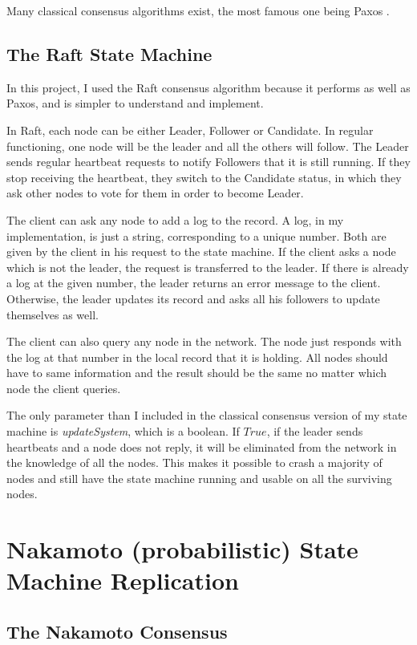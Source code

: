 \documentclass[11pt, twocolumn]{article}
\begin{document}
Many classical consensus algorithms exist, the most famous one being Paxos \cite{parliament}.
\subsection{The Raft State Machine}
In this project, I used the Raft consensus algorithm \cite{understandable} because it performs as well as Paxos, and is simpler to understand and implement.

In Raft, each node can be either Leader, Follower or Candidate. In regular functioning, one node will be the leader and all the others will follow.
The Leader sends regular heartbeat requests to notify Followers that it is still running. If they stop receiving the heartbeat, they switch to the Candidate status, in which they ask other nodes to vote for them in order to become Leader.

The client can ask any node to add a log to the record. A log, in my implementation, is just a string, corresponding to a unique number. Both are given by the client in his request to the state machine.
If the client asks a node which is not the leader, the request is transferred to the leader. If there is already a log at the given number,
the leader returns an error message to the client. Otherwise, the leader updates its record and asks all his followers to update themselves as well.

The client can also query any node in the network. The node just responds with the log at that number in the local record that it is holding. All nodes should have to same information and the result should be the same no matter which node the client queries.

The only parameter than I included in the classical consensus version of my state machine is \emph{updateSystem}, which is a boolean. If $True$, if the leader sends heartbeats and a node does not reply,
it will be eliminated from the network in the knowledge of all the nodes. This makes it possible to
crash a majority of nodes and still have the state machine running and usable on all the surviving nodes.

\section{Nakamoto (probabilistic) State Machine Replication}
\subsection{The Nakamoto Consensus}
\end{document}
